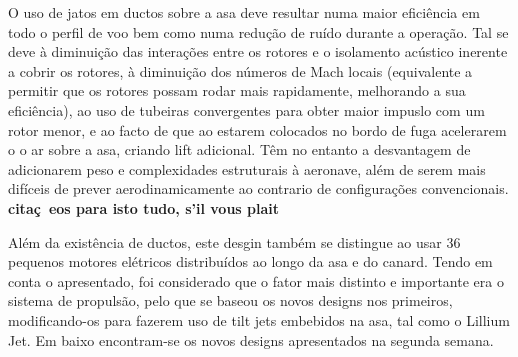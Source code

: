 \FloatBarrier
O uso de jatos em ductos sobre a asa deve resultar numa maior eficiência em todo o perfil de voo bem como numa redução de ruído durante a operação. Tal se deve à diminuição das interações entre os rotores e o isolamento acústico inerente a cobrir os rotores, à diminuição dos números de Mach locais (equivalente a permitir que os rotores possam rodar mais rapidamente, melhorando a sua eficiência), ao uso de tubeiras convergentes para obter maior impuslo com um rotor menor, e ao facto de que ao estarem colocados no bordo de fuga acelerarem o o ar sobre a asa, criando lift adicional. Têm no entanto a desvantagem de adicionarem peso e complexidades estruturais à aeronave, além de serem mais difíceis de prever aerodinamicamente ao contrario de configurações convencionais. {\large{\textbf{citaç~eos para isto tudo, s'il vous plait}}}\par
Além da existência de ductos, este desgin também se distingue ao usar 36 pequenos motores elétricos distribuídos ao longo da asa e do canard.
Tendo em conta o apresentado, foi considerado que o fator mais distinto e importante era o sistema de propulsão, pelo que se baseou os novos designs nos primeiros, modificando-os para fazerem uso de tilt jets embebidos na asa, tal como o Lillium Jet. Em baixo encontram-se os novos designs apresentados na segunda semana.
\FloatBarrier
